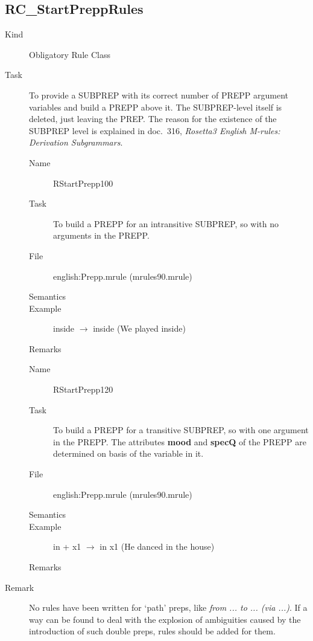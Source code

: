 \subsection{RC\_StartPreppRules}
\begin{description}
\item[Kind] Obligatory Rule Class
\item[Task] To provide a SUBPREP with its correct number of PREPP argument 
variables and build a PREPP above it. The SUBPREP-level itself is deleted, 
just leaving the PREP. The reason for the existence of the SUBPREP level is 
explained in doc.\ 316, {\em Rosetta3 English M-rules: Derivation Subgrammars}. 

\vspace{1 cm}
\begin{description}
\item[Name] RStartPrepp100
\item[Task] To build a PREPP for an intransitive SUBPREP, so with no arguments 
in the PREPP.
\item[File] english:Prepp.mrule (mrules90.mrule)
\item[Semantics]
\item[Example] inside $\rightarrow$ inside (We played inside)
\item[Remarks]
\end{description}

\vspace{1 cm}
\begin{description}
\item[Name] RStartPrepp120
\item[Task] To build a PREPP for a transitive SUBPREP, so with one argument in 
the PREPP. The attributes {\bf mood} and {\bf 
specQ} of the PREPP are determined on basis of the variable in it.
\item[File] english:Prepp.mrule (mrules90.mrule)
\item[Semantics]
\item[Example] in + x1 $\rightarrow$ in x1 (He danced in the house)
\item[Remarks]
\end{description}

\item[Remark] No rules have been written for `path' preps, like {\em from ... 
to ... (via ...)\/}. If a way can be found to deal with the explosion of 
ambiguities caused by the introduction of such double preps, rules should be 
added for them.

\end{description}

